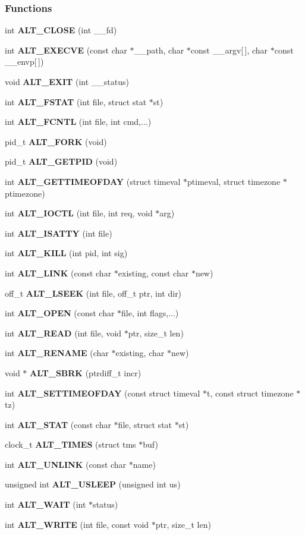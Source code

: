 \subsubsection*{Functions}
\begin{DoxyCompactItemize}
\item 
int {\bf A\+L\+T\+\_\+\+C\+L\+O\+SE} (int \+\_\+\+\_\+fd)
\item 
int {\bf A\+L\+T\+\_\+\+E\+X\+E\+C\+VE} (const char $\ast$\+\_\+\+\_\+path, char $\ast$const \+\_\+\+\_\+argv[$\,$], char $\ast$const \+\_\+\+\_\+envp[$\,$])
\item 
void {\bf A\+L\+T\+\_\+\+E\+X\+IT} (int \+\_\+\+\_\+status)
\item 
int {\bf A\+L\+T\+\_\+\+F\+S\+T\+AT} (int file, struct stat $\ast$st)
\item 
int {\bf A\+L\+T\+\_\+\+F\+C\+N\+TL} (int file, int cmd,...)
\item 
pid\+\_\+t {\bf A\+L\+T\+\_\+\+F\+O\+RK} (void)
\item 
pid\+\_\+t {\bf A\+L\+T\+\_\+\+G\+E\+T\+P\+ID} (void)
\item 
int {\bf A\+L\+T\+\_\+\+G\+E\+T\+T\+I\+M\+E\+O\+F\+D\+AY} (struct timeval $\ast$ptimeval, struct timezone $\ast$ptimezone)
\item 
int {\bf A\+L\+T\+\_\+\+I\+O\+C\+TL} (int file, int req, void $\ast$arg)
\item 
int {\bf A\+L\+T\+\_\+\+I\+S\+A\+T\+TY} (int file)
\item 
int {\bf A\+L\+T\+\_\+\+K\+I\+LL} (int pid, int sig)
\item 
int {\bf A\+L\+T\+\_\+\+L\+I\+NK} (const char $\ast$existing, const char $\ast$new)
\item 
off\+\_\+t {\bf A\+L\+T\+\_\+\+L\+S\+E\+EK} (int file, off\+\_\+t ptr, int dir)
\item 
int {\bf A\+L\+T\+\_\+\+O\+P\+EN} (const char $\ast$file, int flags,...)
\item 
int {\bf A\+L\+T\+\_\+\+R\+E\+AD} (int file, void $\ast$ptr, size\+\_\+t len)
\item 
int {\bf A\+L\+T\+\_\+\+R\+E\+N\+A\+ME} (char $\ast$existing, char $\ast$new)
\item 
void $\ast$ {\bf A\+L\+T\+\_\+\+S\+B\+RK} (ptrdiff\+\_\+t incr)
\item 
int {\bf A\+L\+T\+\_\+\+S\+E\+T\+T\+I\+M\+E\+O\+F\+D\+AY} (const struct timeval $\ast$t, const struct timezone $\ast$tz)
\item 
int {\bf A\+L\+T\+\_\+\+S\+T\+AT} (const char $\ast$file, struct stat $\ast$st)
\item 
clock\+\_\+t {\bf A\+L\+T\+\_\+\+T\+I\+M\+ES} (struct tms $\ast$buf)
\item 
int {\bf A\+L\+T\+\_\+\+U\+N\+L\+I\+NK} (const char $\ast$name)
\item 
unsigned int {\bf A\+L\+T\+\_\+\+U\+S\+L\+E\+EP} (unsigned int us)
\item 
int {\bf A\+L\+T\+\_\+\+W\+A\+IT} (int $\ast$status)
\item 
int {\bf A\+L\+T\+\_\+\+W\+R\+I\+TE} (int file, const void $\ast$ptr, size\+\_\+t len)
\end{DoxyCompactItemize}
